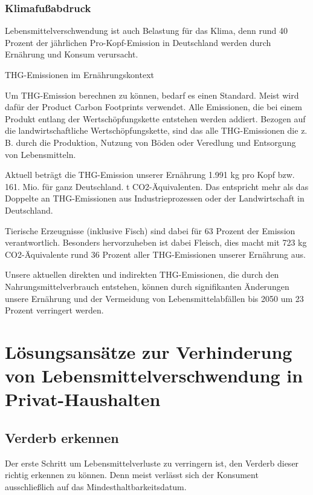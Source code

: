 \subsubsection{Klimafußabdruck}
Lebensmittelverschwendung ist auch Belastung für das Klima, denn rund 40 Prozent der jährlichen Pro-Kopf-Emission in Deutschland werden durch Ernährung und Konsum verursacht. %

THG-Emissionen im Ernährungskontext

Um THG-Emission berechnen zu können, bedarf es einen Standard. Meist wird dafür der Product Carbon Footprints %
verwendet. Alle Emissionen, die bei einem Produkt entlang der Wertschöpfungskette entstehen werden addiert. Bezogen auf die landwirtschaftliche Wertschöpfungskette, sind das alle THG-Emissionen die z. B. durch die Produktion, Nutzung von Böden oder Veredlung und Entsorgung von Lebensmitteln. %

Aktuell beträgt die THG-Emission unserer Ernährung 1.991 kg pro Kopf bzw. 161. Mio. für ganz Deutschland. t CO2-Äquivalenten. Das entspricht mehr als das Doppelte an THG-Emissionen aus Industrieprozessen oder der Landwirtschaft in Deutschland. %

Tierische Erzeugnisse (inklusive Fisch) sind dabei für 63 Prozent der Emission verantwortlich. Besonders hervorzuheben ist dabei Fleisch, dies macht mit 723 kg CO2-Äquivalente rund 36 Prozent aller THG-Emissionen unserer Ernährung aus.  %

Unsere aktuellen direkten und indirekten THG-Emissionen, die durch den Nahrungsmittelverbrauch entstehen, können durch signifikanten Änderungen unsere Ernährung und der Vermeidung von Lebensmittelabfällen bis 2050 um 23 Prozent verringert werden. %


\section{Lösungsansätze zur Verhinderung von Lebensmittelverschwendung in Privat-Haushalten}
\subsection{Verderb erkennen}
Der erste Schritt um Lebensmittelverluste zu verringern ist, den Verderb dieser richtig erkennen zu können. Denn meist verlässt sich der Konsument ausschließlich auf das Mindesthaltbarkeitsdatum.

